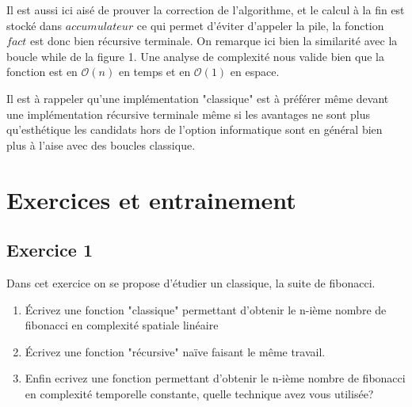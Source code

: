\documentclass[hidelinks]{article}
\begin{document}
    Il est aussi ici aisé de prouver la correction de l'algorithme, et le calcul à la fin est stocké dans $accumulateur$ ce qui 
    permet d'éviter d'appeler la pile, la fonction $fact$ est donc bien récursive terminale.
    On remarque ici bien la similarité avec la boucle while de la figure 1. Une analyse de complexité nous valide bien que 
    la fonction est en $\mathcal{O}(n)$ en temps et en $\mathcal{O}(1)$ en espace.
    \begin{rmq}
        Il est à rappeler qu'une implémentation "classique" est à préférer même devant une implémentation récursive terminale 
        même si les avantages ne sont plus qu'esthétique les candidats hors de l'option informatique sont en général bien plus à l'aise 
        avec des boucles classique. 
    \end{rmq}
    \section{Exercices et entrainement}
    \subsection{Exercice 1}
    Dans cet exercice on se propose d'étudier un classique, la suite de fibonacci.
    \begin{enumerate}
        \item Écrivez une fonction "classique" permettant d'obtenir le n-ième nombre de fibonacci en complexité spatiale linéaire
        \item Écrivez une fonction "récursive" naïve faisant le même travail.
        \item Enfin ecrivez une fonction permettant d'obtenir le n-ième nombre de fibonacci en complexité temporelle constante, quelle  
        technique avez vous utilisée?
    \end{enumerate}
\end{document}
